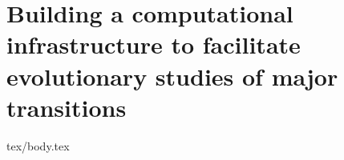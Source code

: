 \chapter{Building a computational infrastructure to facilitate evolutionary studies of major transitions}
\label{ch:infrastructure}

{tex/body.tex}


